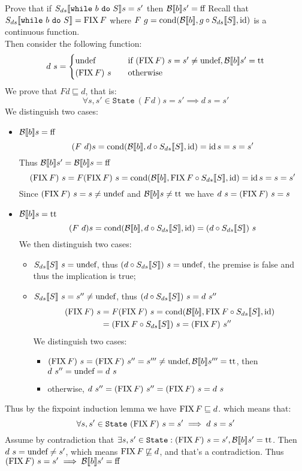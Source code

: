 \begin{exercise}{
    Prove that if $S_{ds} \llbracket \texttt{while}\ b\ \texttt{do}\ S \rrbracket s = s'$ then $\mathcal{B} \llbracket b \rrbracket s' = \text{ff}$
}
    Recall that $S_{ds} \llbracket \texttt{while}\ b\ \texttt{do}\ S \rrbracket = \operatorname{FIX} F$ where $F\ g= \operatorname{cond}(\mathcal{B} \llbracket b \rrbracket, g \circ S_{ds} \llbracket S \rrbracket, \operatorname{id})$ is a continuous function. \\
    Then consider the following function:
    \[
        d\ s = \begin{cases}
            \text{undef} &\quad \text{if } (\operatorname{FIX} F)\ s = s' \neq \text{undef}, \mathcal{B} \llbracket b \rrbracket s' = \text{tt} \\
            (\operatorname{FIX} F)\ s &\quad \text{otherwise}
        \end{cases}
    \]
    We prove that $F d \sqsubseteq d$, that is:
    \[ \forall s, s' \in \texttt{State}\ (F\ d) s = s' \implies d\ s = s' \]
    We distinguish two cases:
    \begin{itemize}
        \item $\mathcal{B} \llbracket b \rrbracket s = \text{ff}$
            \[ (F\ d) s = \operatorname{cond}(\mathcal{B} \llbracket b \rrbracket, d \circ S_{ds} \llbracket S \rrbracket, \operatorname{id}) = \operatorname{id} s = s = s' \]
            Thus $\mathcal{B} \llbracket b \rrbracket s' = \mathcal{B} \llbracket b \rrbracket s = \text{ff}$
            \[ (\operatorname{FIX} F)\ s = F(\operatorname{FIX} F)\ s = \operatorname{cond}(\mathcal{B} \llbracket b \rrbracket, \operatorname{FIX} F \circ S_{ds} \llbracket S \rrbracket, \operatorname{id}) = \operatorname{id} s = s = s' \]
            Since $(\operatorname{FIX} F)\ s = s \neq \text{undef}$ and $\mathcal{B} \llbracket b \rrbracket s \neq \text{tt}$ we have $d\ s = (\operatorname{FIX} F)\ s = s$
        \item $\mathcal{B} \llbracket b \rrbracket s = \text{tt}$
            \[ (F\ d) s = \operatorname{cond}(\mathcal{B} \llbracket b \rrbracket, d \circ S_{ds} \llbracket S \rrbracket, \operatorname{id}) = (d \circ S_{ds} \llbracket S \rrbracket)\ s \]
            We then distinguish two cases:
            \begin{itemize}
                \item $S_{ds} \llbracket S \rrbracket\ s = \text{undef}$, thus $(d \circ S_{ds} \llbracket S \rrbracket)\ s = \text{undef}$, the premise is false and thus the implication is true;
                \item $S_{ds} \llbracket S \rrbracket\ s = s'' \neq \text{undef}$, thus $(d \circ S_{ds} \llbracket S \rrbracket)\ s = d\ s''$
                    \begin{align*}
                        (\operatorname{FIX} F)\ s &= F(\operatorname{FIX} F)\ s = \operatorname{cond}(\mathcal{B} \llbracket b \rrbracket, \operatorname{FIX} F \circ S_{ds} \llbracket S \rrbracket, \operatorname{id}) \\
                        &= (\operatorname{FIX} F \circ S_{ds} \llbracket S \rrbracket)\ s = (\operatorname{FIX} F)\ s''
                    \end{align*}
                    We distinguish two cases:
                    \begin{itemize}
                        \item $(\operatorname{FIX} F)\ s = (\operatorname{FIX} F)\ s'' = s''' \neq \text{undef}, \mathcal{B} \llbracket b \rrbracket s''' = \text{tt}$, then $d\ s'' = \text{undef} = d\ s$
                        \item otherwise, $d\ s'' = (\operatorname{FIX} F)\ s'' = (\operatorname{FIX} F)\ s = d\ s$
                    \end{itemize}
            \end{itemize}
    \end{itemize}
    Thus by the fixpoint induction lemma we have $\operatorname{FIX} F \sqsubseteq d$. which means that:
    \[ \forall s, s' \in \texttt{State}\ (\FIX F)\ s = s' \implies d\ s = s' \]
    Assume by contradiction that $\exists s, s' \in \texttt{State} : (\operatorname{FIX} F)\ s = s', \mathcal{B} \llbracket b \rrbracket s' = \text{tt} $. Then $d\ s = \undef \neq s'$, which means $\operatorname{FIX} F \not\sqsubseteq d$, and that's a contradiction. Thus $(\operatorname{FIX} F)\ s = s' \implies \mathcal{B} \llbracket b \rrbracket s' = \text{ff}$
\end{exercise}
